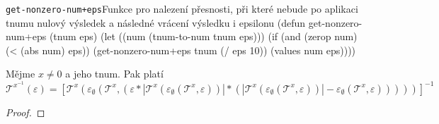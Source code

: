\begin{lispcode}{\texttt{get-nonzero-num+eps}}{Funkce pro nalezení přesnosti, při které nebude po aplikaci tnumu nulový výsledek a následné vrácení výsledku i epsilonu}
(\textcolor{funkcionalni}{defun} \textcolor{pojmenovan}{get-nonzero-num+eps} (tnum eps)
  (\textcolor{vedlejsi}{let} ((num (\textcolor{moje}{tnum-to-num} tnum eps)))
    (\textcolor{funkcionalni}{if} (\textcolor{funkcionalni}{and} (\textcolor{funkcionalni}{zerop} num) (\textcolor{matematicke}{<} (\textcolor{matematicke}{abs} num) eps))
      (\textcolor{moje}{get-nonzero-num+eps} tnum (\textcolor{matematicke}{/} eps 10))
      (\textcolor{matematicke}{values} num eps))))
\end{lispcode}

\begin{theorem}\label{hyp:prevraceni_tnumu}
Mějme $x \neq 0$ a jeho tnum. Pak platí
\begin{equation}
\mathcal{T}^{x^{-1}}(\varepsilon)=\left[\mathcal{T}^x(\varepsilon_\emptyset(\mathcal{T}^x, (\varepsilon*|\mathcal{T}^x(\varepsilon_\emptyset(\mathcal{T}^x, \varepsilon))|*(|\mathcal{T}^x(\varepsilon_\emptyset(\mathcal{T}^x, \varepsilon))|-\varepsilon_\emptyset(\mathcal{T}^x, \varepsilon)))))\right]^{-1}
\end{equation}
\begin{proof}


\end{proof}
\end{theorem}
